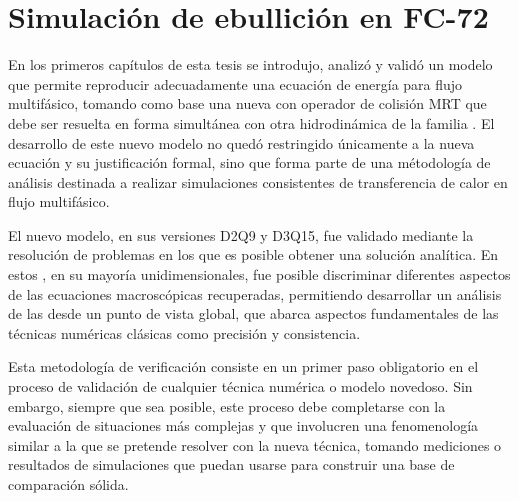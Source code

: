 \chapter{Simulaci\'on de ebullici\'on en FC-72}

En los primeros cap\'itulos de esta tesis se introdujo, analiz\'o y valid\'o un modelo que permite reproducir adecuadamente una ecuaci\'on de energ\'ia para flujo multif\'asico, tomando como base una nueva \lbe{} con operador de colisi\'on MRT que debe ser resuelta en forma simult\'anea con otra \lbe{} hidrodin\'amica de la familia \pp{}. El desarrollo de este nuevo modelo no qued\'o restringido \'unicamente a la nueva ecuaci\'on y su justificaci\'on formal, sino que forma parte de una m\'etodolog\'ia de an\'alisis destinada a realizar simulaciones consistentes de transferencia de calor en flujo multif\'asico.

El nuevo modelo, en sus versiones D2Q9 y D3Q15, fue validado mediante la resoluci\'on de problemas en los que es posible obtener una soluci\'on anal\'itica. En estos , en su mayor\'ia unidimensionales, fue posible discriminar diferentes aspectos de las ecuaciones macrosc\'opicas recuperadas, permitiendo desarrollar un an\'alisis de las \lbe{} desde un punto de vista global, que abarca aspectos fundamentales de las t\'ecnicas num\'ericas cl\'asicas como precisi\'on y consistencia. 

Esta metodolog\'ia de verificaci\'on consiste en un primer paso obligatorio en el proceso de validaci\'on de cualquier t\'ecnica num\'erica o modelo novedoso. Sin embargo, siempre que sea posible, este proceso debe completarse con la evaluaci\'on de situaciones m\'as complejas y que involucren una fenomenolog\'ia similar a la que se pretende resolver con la nueva t\'ecnica, tomando mediciones o resultados de simulaciones que puedan usarse para construir una base de comparaci\'on s\'olida.

